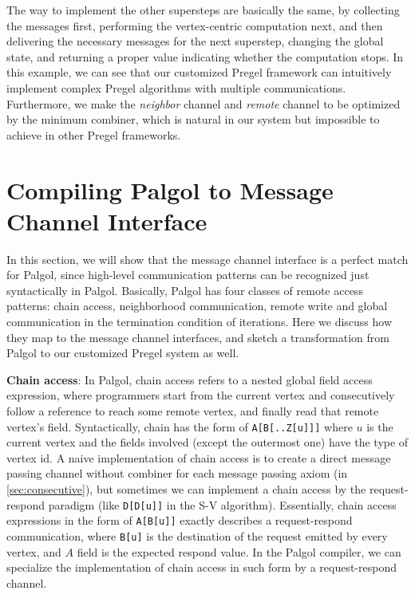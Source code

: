 \documentclass{sokendai_thesis} %
\begin{document}
The way to implement the other supersteps are basically the same, by collecting the messages first, performing the vertex-centric computation next, and then delivering the necessary messages for the next superstep, changing the global state, and returning a proper value indicating whether the computation stops.
In this example, we can see that our customized Pregel framework can intuitively implement complex Pregel algorithms with multiple communications.
Furthermore, we make the \emph{neighbor} channel and \emph{remote} channel to be optimized by the minimum combiner, which is natural in our system but impossible to achieve in other Pregel frameworks.

\section{Compiling Palgol to Message Channel Interface}

In this section, we will show that the message channel interface is a perfect match for Palgol, since high-level communication patterns can be recognized just syntactically in Palgol.
Basically, Palgol has four classes of remote access patterns: chain access, neighborhood communication, remote write and global communication in the termination condition of iterations.
Here we discuss how they map to the message channel interfaces, and sketch a transformation from Palgol to our customized Pregel system as well.

\textbf{Chain access}: In Palgol, chain access refers to a nested global field access expression, where programmers start from the current vertex and consecutively follow a reference to reach some remote vertex, and finally read that remote vertex's field.
Syntactically, chain has the form of \texttt{A[B[..Z[u]]]} where $u$ is the current vertex and the fields involved (except the outermost one) have the type of vertex id.
A naive implementation of chain access is to create a direct message passing channel without combiner for each message passing axiom (in \autoref{sec:consecutive}), but sometimes we can implement a chain access by the request-respond paradigm (like \texttt{D[D[u]]} in the S-V algorithm).
Essentially, chain access expressions in the form of \texttt{A[B[u]]} exactly describes a request-respond communication, where \texttt{B[u]} is the destination of the request emitted by every vertex, and $A$ field is the expected respond value.
In the Palgol compiler, we can specialize the implementation of chain access in such form by a request-respond channel.
\end{document}
